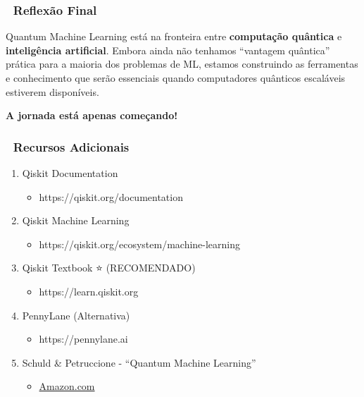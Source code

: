 \documentclass[
  brazilian,
]{report}
\providecommand{\tightlist}{%
  \setlength{\itemsep}{0pt}\setlength{\parskip}{0pt}}
\begin{document}
\subsubsection{🌟 Reflexão Final}\label{reflexuxe3o-final-1}

Quantum Machine Learning está na fronteira entre \textbf{computação
quântica} e \textbf{inteligência artificial}. Embora ainda não tenhamos
``vantagem quântica'' prática para a maioria dos problemas de ML,
estamos construindo as ferramentas e conhecimento que serão essenciais
quando computadores quânticos escaláveis estiverem disponíveis.

\textbf{A jornada está apenas começando!} 🚀

\subsubsection{🔗 Recursos Adicionais}\label{recursos-adicionais}

\begin{enumerate}
\def\labelenumi{\arabic{enumi}.}
\tightlist
\item
  Qiskit Documentation

  \begin{itemize}
  \tightlist
  \item
    https://qiskit.org/documentation
  \end{itemize}
\item
  Qiskit Machine Learning

  \begin{itemize}
  \tightlist
  \item
    https://qiskit.org/ecosystem/machine-learning
  \end{itemize}
\item
  Qiskit Textbook ⭐ (RECOMENDADO)

  \begin{itemize}
  \tightlist
  \item
    https://learn.qiskit.org
  \end{itemize}
\item
  PennyLane (Alternativa)

  \begin{itemize}
  \tightlist
  \item
    https://pennylane.ai
  \end{itemize}
\item
  Schuld \& Petruccione - ``Quantum Machine Learning''

  \begin{itemize}
  \tightlist
  \item
    \href{https://www.amazon.com/Machine-Learning-with-Quantum-Computers-_Quantum-Science-and-Technology_/dp/3030830977}{Amazon.com}
  \end{itemize}
\end{enumerate}
\end{document}
